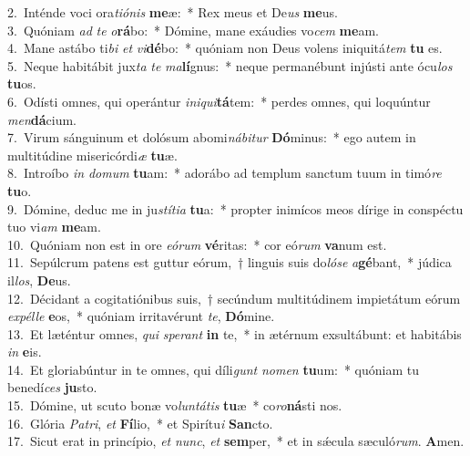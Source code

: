 {2.~}Inténde voci ora\textit{ti}\textit{ó}\textit{nis} \textbf{me}æ:~* Rex meus et De\textit{us} \textbf{me}us.\\
{3.~}Quóniam \textit{ad} \textit{te} \textit{o}\textbf{rá}bo:~* Dómine, mane exáudies vo\textit{cem} \textbf{me}am.\\
{4.~}Mane astábo ti\textit{bi} \textit{et} \textit{vi}\textbf{dé}bo:~* quóniam non Deus volens iniquitá\textit{tem} \textbf{tu} es.\\
{5.~}Neque habitábit jux\textit{ta} \textit{te} \textit{ma}\textbf{lí}gnus:~* neque permanébunt injústi ante ócu\textit{los} \textbf{tu}os.\\
{6.~}Odísti omnes, qui operántur \textit{i}\textit{ni}\textit{qui}\textbf{tá}tem:~* perdes omnes, qui loquúntur \textit{men}\textbf{dá}cium.\\
{7.~}Virum sánguinum et dolósum abomi\textit{ná}\textit{bi}\textit{tur} \textbf{Dó}minus:~* ego autem in multitúdine misericórdi\textit{æ} \textbf{tu}æ.\\
{8.~}Introíbo \textit{in} \textit{do}\textit{mum} \textbf{tu}am:~* adorábo ad templum sanctum tuum in timó\textit{re} \textbf{tu}o.\\
{9.~}Dómine, deduc me in ju\textit{stí}\textit{ti}\textit{a} \textbf{tu}a:~* propter inimícos meos dírige in conspéctu tuo vi\textit{am} \textbf{me}am.\\
{10.~}Quóniam non est in ore \textit{e}\textit{ó}\textit{rum} \textbf{vé}ritas:~* cor eó\textit{rum} \textbf{va}num est.\\
{11.~}Sepúlcrum patens est guttur eórum,~† linguis suis do\textit{ló}\textit{se} \textit{a}\textbf{gé}bant,~* júdica il\textit{los}, \textbf{De}us.\\
{12.~}Décidant a cogitatiónibus suis,~† secúndum multitúdinem impietátum eórum \textit{ex}\textit{pél}\textit{le} \textbf{e}os,~* quóniam irritavérunt \textit{te}, \textbf{Dó}mine.\\
{13.~}Et læténtur omnes, \textit{qui} \textit{spe}\textit{rant} \textbf{in} te,~* in ætérnum exsultábunt: et habitábis \textit{in} \textbf{e}is.\\
{14.~}Et gloriabúntur in te omnes, qui díli\textit{gunt} \textit{no}\textit{men} \textbf{tu}um:~* quóniam tu benedí\textit{ces} \textbf{ju}sto.\\
{15.~}Dómine, ut scuto bonæ vo\textit{lun}\textit{tá}\textit{tis} \textbf{tu}æ~* co\textit{ro}\textbf{ná}sti nos.\\
{16.~}Glória \textit{Pa}\textit{tri}, \textit{et} \textbf{Fí}lio,~* et Spirítu\textit{i} \textbf{San}cto.\\
{17.~}Sicut erat in princípio, \textit{et} \textit{nunc}, \textit{et} \textbf{sem}per,~* et in sǽcula sæculó\textit{rum}. \textbf{A}men.\\
